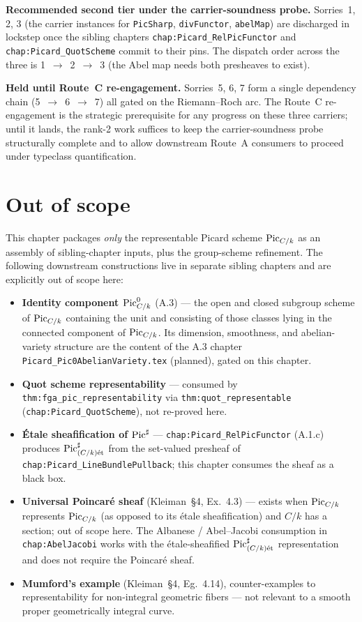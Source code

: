 \textbf{Recommended second tier under the carrier-soundness probe.}
Sorries~1, 2, 3 (the carrier instances for
\texttt{PicSharp}, \texttt{divFunctor}, \texttt{abelMap}) are
discharged in lockstep once the sibling chapters
\texttt{chap:Picard_RelPicFunctor} and \texttt{chap:Picard_QuotScheme}
commit to their pins. The dispatch order across the three is
1~$\to$~2~$\to$~3 (the Abel map needs both presheaves to exist).

\textbf{Held until Route~C re-engagement.} Sorries~5, 6, 7 form a
single dependency chain (5~$\to$~6~$\to$~7) all gated on the
Riemann--Roch arc. The Route~C re-engagement is the strategic
prerequisite for any progress on these three carriers; until it
lands, the rank-2 work suffices to keep the carrier-soundness probe
structurally complete and to allow downstream Route~A consumers to
proceed under typeclass quantification.

\section{Out of scope}
\label{sec:fga_pic_out_of_scope}

This chapter packages \emph{only} the representable Picard scheme
\(\operatorname{Pic}_{C/k}\) as an assembly of sibling-chapter inputs, plus the
group-scheme refinement. The following downstream constructions live in
separate sibling chapters and are explicitly out of scope here:
\begin{itemize}
  \item \textbf{Identity component \(\operatorname{Pic}^0_{C/k}\)} (A.3) --- the open and
    closed subgroup scheme of \(\operatorname{Pic}_{C/k}\) containing the unit and
    consisting of those classes lying in the connected component of
    \(\operatorname{Pic}_{C/k}\). Its dimension, smoothness, and abelian-variety
    structure are the content of the A.3 chapter
    \texttt{Picard\_Pic0AbelianVariety.tex} (planned), gated on this
    chapter.
  \item \textbf{Quot scheme representability} --- consumed by
    \texttt{thm:fga_pic_representability} via \texttt{thm:quot\_representable}
    (\texttt{chap:Picard_QuotScheme}), not re-proved here.
  \item \textbf{\'Etale sheafification of \(\operatorname{Pic}^\sharp\)} ---
    \texttt{chap:Picard_RelPicFunctor} (A.1.c) produces
    \(\operatorname{Pic}^\sharp_{(C/k)\mathrm{\acute{e}t}}\) from the set-valued presheaf of
    \texttt{chap:Picard_LineBundlePullback}; this chapter consumes the
    sheaf as a black box.
  \item \textbf{Universal Poincar\'e sheaf} (Kleiman~\S 4, Ex.~4.3)
    --- exists when \(\operatorname{Pic}_{C/k}\) represents \(\operatorname{Pic}_{C/k}\) (as opposed to
    its \'etale sheafification) and \(C/k\) has a section; out of scope
    here. The Albanese / Abel--Jacobi consumption in
    \texttt{chap:AbelJacobi} works with the \'etale-sheafified
    \(\operatorname{Pic}^\sharp_{(C/k)\mathrm{\acute{e}t}}\) representation and does not require the
    Poincar\'e sheaf.
  \item \textbf{Mumford's example} (Kleiman~\S 4, Eg.~4.14), counter-examples
    to representability for non-integral geometric fibers --- not
    relevant to a smooth proper geometrically integral curve.
\end{itemize}

